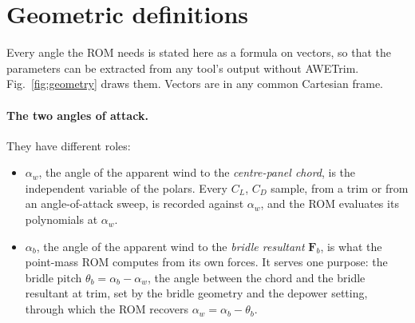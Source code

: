 \documentclass[11pt,a4paper]{article}
\begin{document}
\section{Geometric definitions}
\label{sec:geometry}
Every angle the ROM needs is stated here as a formula on vectors, so that the
parameters can be extracted from any tool's output without AWETrim.
Fig.~\ref{fig:geometry} draws them. Vectors are in any common Cartesian frame.

\paragraph{The two angles of attack.} They have different roles:
\begin{itemize}
  \item $\alpha_w$, the angle of the apparent wind to the \emph{centre-panel
        chord}, is the independent variable of the polars. Every $C_L$, $C_D$
        sample, from a trim or from an angle-of-attack sweep, is recorded
        against $\alpha_w$, and the ROM evaluates its polynomials at
        $\alpha_w$.
  \item $\alpha_b$, the angle of the apparent wind to the \emph{bridle
        resultant} $\mathbf F_b$, is what the point-mass ROM computes from its
        own forces. It serves one purpose: the bridle pitch
        $\theta_b=\alpha_b-\alpha_w$, the angle between the chord and the
        bridle resultant at trim, set by the bridle geometry and the depower
        setting, through which the ROM recovers $\alpha_w=\alpha_b-\theta_b$.
\end{itemize}
\end{document}
